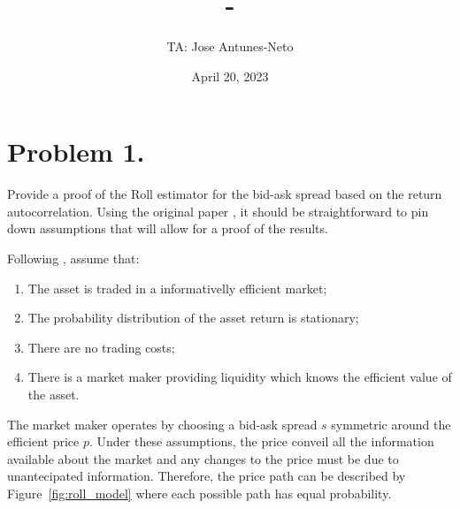 \documentclass[12pt,twoside]{article}
\title{\course-\assignment}
\author{TA: Jose Antunes-Neto}
\date{April 20, 2023}
\begin{document}
\nocite{*}
\maketitle

\section{Problem 1.}
Provide a proof of the Roll estimator for the bid-ask spread based on the return autocorrelation. Using the original paper \citep{roll1984simple}, it should be straightforward to pin down assumptions that will allow for a proof of the results.

\begin{solution}
    Following \citet{roll1984simple}, assume that:
    \begin{enumerate}[label = \arabic*)]
        \item The asset is traded in a informativelly efficient market;
        \item The probability distribution of the asset return is stationary;
        \item There are no trading costs;
        \item There is a market maker providing liquidity which knows the efficient value of the asset.
    \end{enumerate}
    The market maker operates by choosing a bid-ask spread \(s\) symmetric around the efficient price \(p\). Under these assumptions, the price conveil all the information available about the market and any changes to the price must be due to unantecipated information. Therefore, the price path can be described by Figure~\ref{fig:roll_model} where each possible path has equal probability.
    \begin{figure}[!htbp]
        \centering
\end{figure}
\end{solution}
\end{document}
